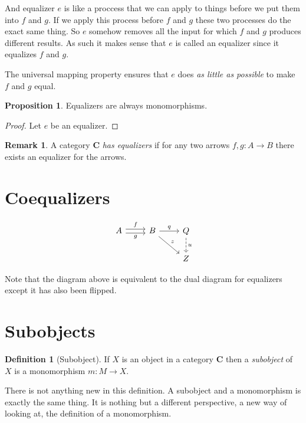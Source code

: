 \documentclass{book}
\theoremstyle{definition}
\newtheorem{definition}{Definition}[section]
\newtheorem{proposition}{Proposition}
\newtheorem*{remark}{Remark}
\begin{document}
And equalizer $e$ is like a proccess that we can apply to things before we put
them into $f$ and $g$. If we apply this process before $f$ and $g$ these two
processes do the exact same thing. So $e$ somehow removes all the input for
which $f$ and $g$ produces different results. As such it makes sense that $e$ is
called an equalizer since it equalizes $f$ and $g$.

The universal mapping property ensures that $e$ does \emph{as little as
  possible} to make $f$ and $g$ equal.

\begin{proposition}
  Equalizers are always monomorphisms.
\end{proposition}
\begin{proof}
  Let $e$ be an equalizer. %
\end{proof}

\begin{remark}
  A category \textbf{C} \emph{has equalizers} if for any two arrows
  $f, g : A \to B$ there exists an equalizer for the arrows.
\end{remark}

\section{Coequalizers}

\[
  \begin{tikzcd}
    A \ar[r, shift left, "f"] \ar[r, shift right, "g"'] & B \ar[r, "q"] \ar[rd, "z"] & Q \ar[d, dashrightarrow, "u"] \\
    & & Z
  \end{tikzcd}
\]

Note that the diagram above is equivalent to the dual diagram for equalizers
except it has also been flipped.

\section{Subobjects}

\begin{definition}[Subobject]
  If $X$ is an object in a category \textbf{C} then a \emph{subobject} of $X$ is
  a monomorphism $m : M \to X$.
\end{definition}

There is not anything new in this definition. A subobject and a monomorphism is
exactly the same thing. It is nothing but a different perspective, a new way of
looking at, the definition of a monomorphism.
\end{document}
